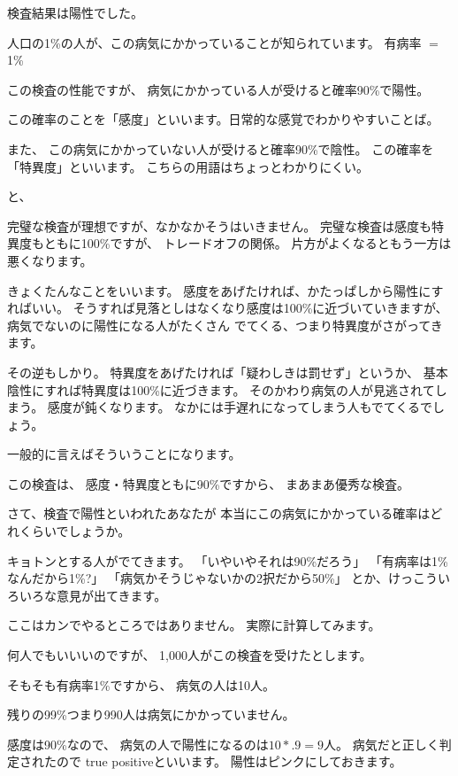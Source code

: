 \documentclass[uplatex,jis2004,dvipdfmx,12pt]{jsarticle}
\begin{document}
検査結果は陽性でした。

人口の1\%の人が、この病気にかかっていることが知られています。
有病率 $=$ 1\%

この検査の性能ですが、
病気にかかっている人が受けると確率90\%で陽性。

この確率のことを「感度」といいます。日常的な感覚でわかりやすいことば。

また、
この病気にかかっていない人が受けると確率90\%で陰性。
この確率を「特異度」といいます。
こちらの用語はちょっとわかりにくい。

と、

完璧な検査が理想ですが、なかなかそうはいきません。
完璧な検査は感度も特異度もともに100\%ですが、
トレードオフの関係。
片方がよくなるともう一方は悪くなります。

きょくたんなことをいいます。
感度をあげたければ、かたっぱしから陽性にすればいい。
そうすれば見落としはなくなり感度は100\%に近づいていきますが、
病気でないのに陽性になる人がたくさん
でてくる、つまり特異度がさがってきます。

その逆もしかり。
特異度をあげたければ「疑わしきは罰せず」というか、
基本陰性にすれば特異度は100\%に近づきます。
そのかわり病気の人が見逃されてしまう。
感度が鈍くなります。
なかには手遅れになってしまう人もでてくるでしょう。

一般的に言えばそういうことになります。

この検査は、
感度・特異度ともに90\%ですから、
まあまあ優秀な検査。


さて、検査で陽性といわれたあなたが
本当にこの病気にかかっている確率はどれくらいでしょうか。

キョトンとする人がでてきます。
「いやいやそれは90\%だろう」
「有病率は1\%なんだから1\%?」
「病気かそうじゃないかの2択だから50\%」
とか、けっこういろいろな意見が出てきます。

ここはカンでやるところではありません。
実際に計算してみます。


何人でもいいいのですが、
1,000人がこの検査を受けたとします。


そもそも有病率1\%ですから、
病気の人は10人。

残りの99\%つまり990人は病気にかかっていません。

感度は90\%なので、
病気の人で陽性になるのは$10*.9=9$人。
病気だと正しく判定されたので
true positiveといいます。
陽性はピンクにしておきます。
\end{document}
